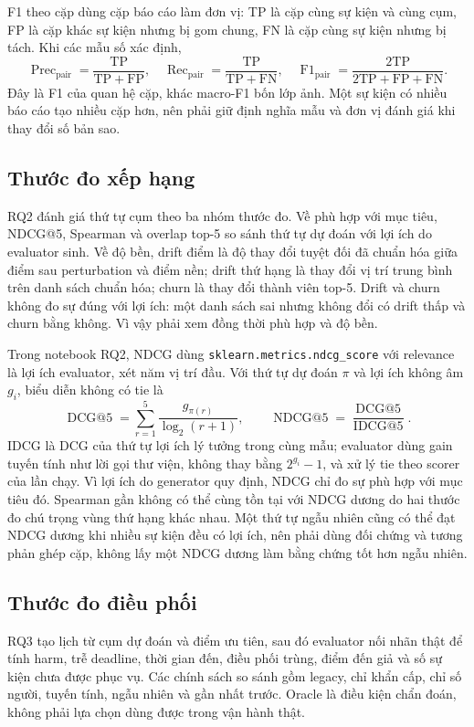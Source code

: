F1 theo cặp dùng cặp báo cáo làm đơn vị: TP là cặp cùng sự kiện và cùng cụm, FP là cặp khác sự kiện nhưng bị gom chung, FN là cặp cùng sự kiện nhưng bị tách. Khi các mẫu số xác định,
\begin{equation}
\operatorname{Prec}_{\mathrm{pair}}=\frac{\mathrm{TP}}{\mathrm{TP}+\mathrm{FP}},\quad
\operatorname{Rec}_{\mathrm{pair}}=\frac{\mathrm{TP}}{\mathrm{TP}+\mathrm{FN}},\quad
\operatorname{F1}_{\mathrm{pair}}=\frac{2\mathrm{TP}}{2\mathrm{TP}+\mathrm{FP}+\mathrm{FN}}.
\end{equation}
Đây là F1 của quan hệ cặp, khác macro-F1 bốn lớp ảnh. Một sự kiện có nhiều báo cáo tạo nhiều cặp hơn, nên phải giữ định nghĩa mẫu và đơn vị đánh giá khi thay đổi số bản sao.

\subsection{Thước đo xếp hạng}
RQ2 đánh giá thứ tự cụm theo ba nhóm thước đo. Về phù hợp với mục tiêu, NDCG@5, Spearman và overlap top-5 so sánh thứ tự dự đoán với lợi ích do evaluator sinh. Về độ bền, drift điểm là độ thay đổi tuyệt đối đã chuẩn hóa giữa điểm sau perturbation và điểm nền; drift thứ hạng là thay đổi vị trí trung bình trên danh sách chuẩn hóa; churn là thay đổi thành viên top-5. Drift và churn không đo sự đúng với lợi ích: một danh sách sai nhưng không đổi có drift thấp và churn bằng không. Vì vậy phải xem đồng thời phù hợp và độ bền.

Trong notebook RQ2, NDCG dùng \texttt{sklearn.metrics.ndcg\_score} với relevance là lợi ích evaluator, xét năm vị trí đầu. Với thứ tự dự đoán $\pi$ và lợi ích không âm $g_i$, biểu diễn không có tie là
\begin{equation}
\operatorname{DCG@5}=\sum_{r=1}^{5}\frac{g_{\pi(r)}}{\log_2(r+1)},\qquad
\operatorname{NDCG@5}=\frac{\operatorname{DCG@5}}{\operatorname{IDCG@5}}.
\end{equation}
IDCG là DCG của thứ tự lợi ích lý tưởng trong cùng mẫu; evaluator dùng gain tuyến tính như lời gọi thư viện, không thay bằng $2^{g_i}-1$, và xử lý tie theo scorer của lần chạy. Vì lợi ích do generator quy định, NDCG chỉ đo sự phù hợp với mục tiêu đó. Spearman gần không có thể cùng tồn tại với NDCG dương do hai thước đo chú trọng vùng thứ hạng khác nhau. Một thứ tự ngẫu nhiên cũng có thể đạt NDCG dương khi nhiều sự kiện đều có lợi ích, nên phải dùng đối chứng và tương phản ghép cặp, không lấy một NDCG dương làm bằng chứng tốt hơn ngẫu nhiên.

\subsection{Thước đo điều phối}
RQ3 tạo lịch từ cụm dự đoán và điểm ưu tiên, sau đó evaluator nối nhãn thật để tính harm, trễ deadline, thời gian đến, điều phối trùng, điểm đến giả và số sự kiện chưa được phục vụ. Các chính sách so sánh gồm legacy, chỉ khẩn cấp, chỉ số người, tuyến tính, ngẫu nhiên và gần nhất trước. Oracle là điều kiện chẩn đoán, không phải lựa chọn dùng được trong vận hành thật.

